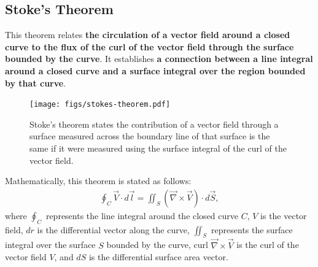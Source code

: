 \documentclass[12pt,b4paper]{article}
\begin{document}
\subsection*{Stoke's Theorem}
This theorem relates \textbf{the circulation of a vector field around a closed curve to the flux of the curl of the vector field through the surface bounded by the curve}. It establishes \textbf{a connection between a line integral around a closed curve and a surface integral over the region bounded by that curve}.
\begin{figure}[H]
    \centering
    \texttt{[image: figs/stokes-theorem.pdf]}
    \caption{Stoke's theorem states the contribution of a vector field through a surface measured across the boundary line of that surface is the same if it were measured using the surface integral of the curl of the vector field.}
    \label{fig:stokes-theorem}
\end{figure}
Mathematically, this theorem is stated as follows:
\begin{align}
    \oint_C \vec{V}\cdot d\vec{l}=\iint_S (\Vec{\nabla}\times\vec{V})\cdot d\vec{S},
\end{align}
where $\displaystyle\oint_C$ represents the line integral around the closed curve $C$, $V$ is the vector field, $dr$ is the differential vector along the curve, $\displaystyle\iint_S$ represents the surface integral over the surface $S$ bounded by the curve, curl $\displaystyle\Vec{\nabla}\times\vec{V}$ is the curl of the vector field $V$, and $dS$ is the differential surface area vector.
\end{document}
